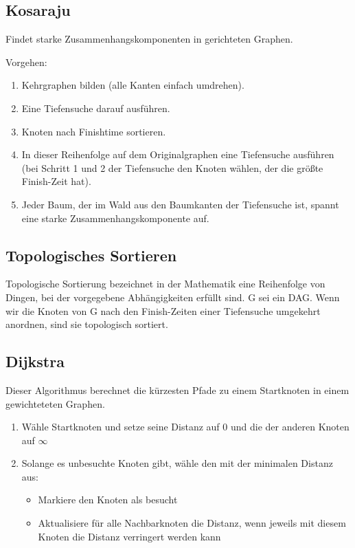 \documentclass[11pt]{scrartcl}
\begin{document}
\subsection{Kosaraju}
Findet starke Zusammenhangskomponenten in gerichteten Graphen.

Vorgehen:
\begin{enumerate}
\item Kehrgraphen bilden (alle Kanten einfach umdrehen).
\item Eine Tiefensuche darauf ausführen.
\item Knoten nach Finishtime sortieren.
\item In dieser Reihenfolge auf dem Originalgraphen eine Tiefensuche ausführen (bei Schritt 1 und 2 der Tiefensuche den Knoten wählen, der die größte Finish-Zeit hat).
\item Jeder Baum, der im Wald aus den Baumkanten der Tiefensuche ist, spannt eine starke Zusammenhangskomponente auf.
\end{enumerate}
\subsection{Topologisches Sortieren}
Topologische Sortierung bezeichnet in der Mathematik eine Reihenfolge von Dingen, bei der vorgegebene Abhängigkeiten erfüllt sind.
G sei ein DAG. Wenn wir die Knoten von G nach den Finish-Zeiten einer Tiefensuche umgekehrt anordnen, sind sie topologisch sortiert.

\subsection{Dijkstra}
Dieser Algorithmus berechnet die kürzesten Pfade zu einem Startknoten in einem gewichteteten Graphen.
\begin{enumerate}
	\item Wähle Startknoten und setze seine Distanz auf 0 und die der anderen Knoten auf $\infty$
    \item Solange es unbesuchte Knoten gibt, wähle den mit der minimalen Distanz aus:
    \begin{itemize}
		\item Markiere den Knoten als besucht
        \item Aktualisiere für alle Nachbarknoten die Distanz, wenn jeweils mit diesem Knoten die Distanz verringert werden kann
	\end{itemize}
\end{enumerate}
\end{document}
